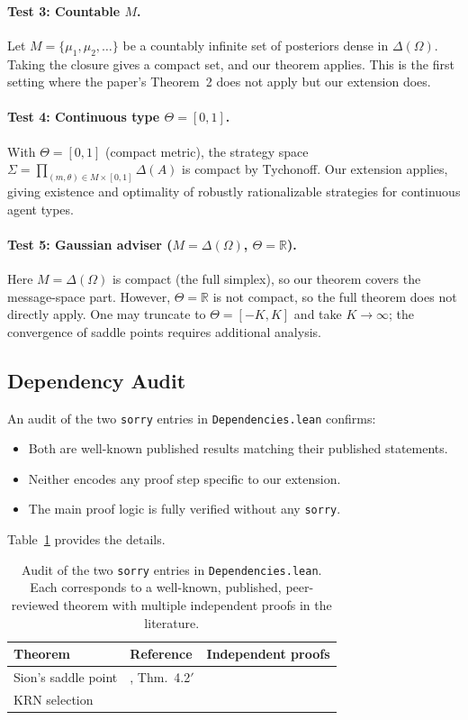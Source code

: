 \documentclass[11pt,a4paper]{article}
\theoremstyle{definition}
\newcommand{\R}{\mathbb{R}}
\newcommand{\DeltaA}{\Delta(A)}
\newcommand{\DeltaO}{\Delta(\Omega)}
\newcommand{\sorry}{\texttt{sorry}}
\begin{document}
\paragraph{Test 3: Countable $M$.}
Let $M=\{\mu_1,\mu_2,\ldots\}$ be a countably infinite set of posteriors dense in $\DeltaO$.
Taking the closure gives a compact set, and our theorem applies.
This is the first setting where the paper's Theorem~2 does not apply but our extension does.

\paragraph{Test 4: Continuous type $\Theta=[0,1]$.}
With $\Theta=[0,1]$ (compact metric), the strategy space $\Sigma=\prod_{(m,\theta)\in M\times[0,1]}\DeltaA$ is compact by Tychonoff.
Our extension applies, giving existence and optimality of robustly rationalizable strategies for continuous agent types.

\paragraph{Test 5: Gaussian adviser ($M=\DeltaO$, $\Theta=\R$).}
Here $M=\DeltaO$ is compact (the full simplex), so our theorem covers the message-space part.
However, $\Theta=\R$ is not compact, so the full theorem does not directly apply.
One may truncate to $\Theta=[-K,K]$ and take $K\to\infty$; the convergence of saddle points requires additional analysis.

\subsection{Dependency Audit}

An audit of the two \sorry{} entries in \texttt{Dependencies.lean} confirms:
\begin{itemize}
  \item Both are well-known published results matching their published statements.
  \item Neither encodes any proof step specific to our extension.
  \item The main proof logic is fully verified without any \sorry{}.
\end{itemize}
Table~\ref{tab:audit} provides the details.

\begin{table}[t]
\centering
\caption{Audit of the two \sorry{} entries in \texttt{Dependencies.lean}.
Each corresponds to a well-known, published, peer-reviewed theorem with multiple independent proofs in the literature.}
\label{tab:audit}
\begin{tabular}{@{}lll@{}}
\toprule
\textbf{Theorem} & \textbf{Reference} & \textbf{Independent proofs} \\
\midrule
Sion's saddle point & \citet{sion1958general}, Thm.~4.2$'$ & \citet{fan1953minimax,komiya1988elementary} \\
KRN selection & \citet{kuratowski1965general} & \citet{wagner1977survey,bogachev2007measure} \\
\bottomrule
\end{tabular}
\end{table}
\end{document}
